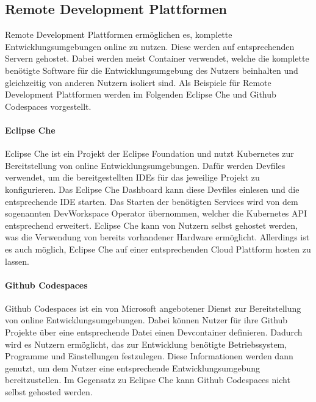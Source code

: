 \subsection{Remote Development Plattformen}\label{section:stand-der-technik:weitere-entwicklungen:remote-development-plattformen}

Remote Development Plattformen ermöglichen es, komplette Entwicklungsumgebungen online zu nutzen. Diese werden auf entsprechenden Servern gehostet. Dabei werden meist Container verwendet, welche die komplette benötigte Software für die Entwicklungsumgebung des Nutzers beinhalten und gleichzeitig von anderen Nutzern isoliert sind. Als Beispiele für Remote Development Plattformen werden im Folgenden Eclipse Che \cite{noauthor_eclipse-che_nodate} und Github Codespaces \cite{noauthor_github-codespaces_2024} vorgestellt.

\paragraph{Eclipse Che}
Eclipse Che \cite{noauthor_eclipse-che_nodate} ist ein Projekt der Eclipse Foundation \cite{milinkovich_eclipse-foundation_nodate} und nutzt Kubernetes \cite{noauthor_kubernetes_nodate} zur Bereitstellung von online Entwicklungsumgebungen. Dafür werden Devfiles \cite{noauthor_devfile_nodate} verwendet, um die bereitgestellten IDEs für das jeweilige Projekt zu konfigurieren. Das Eclipse Che Dashboard kann diese Devfiles einlesen und die entsprechende IDE starten. Das Starten der benötigten Services wird von dem sogenannten DevWorkspace Operator übernommen, welcher die Kubernetes API entsprechend erweitert. Eclipse Che kann von Nutzern selbst gehostet werden, was die Verwendung von bereits vorhandener Hardware ermöglicht. Allerdings ist es auch möglich, Eclipse Che auf einer entsprechenden Cloud Plattform hosten zu lassen.

\paragraph{Github Codespaces}
Github Codespaces \cite{noauthor_github-codespaces_2024} ist ein von Microsoft \cite{noauthor_microsoft_nodate} angebotener Dienst zur Bereitstellung von online Entwicklungsumgebungen. Dabei können Nutzer für ihre Github Projekte über eine entsprechende Datei einen Devcontainer \cite{noauthor_devcontainer_nodate} definieren. Dadurch wird es Nutzern ermöglicht, das zur Entwicklung benötigte Betriebssystem, Programme und Einstellungen festzulegen. Diese Informationen werden dann genutzt, um dem Nutzer eine entsprechende Entwicklungsumgebung bereitzustellen. Im Gegensatz zu Eclipse Che kann Github Codespaces nicht selbst gehosted werden.
